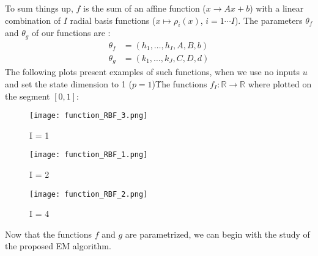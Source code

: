 To sum things up, $f$ is the sum of an affine function ($x \rightarrow Ax + b$) with a linear combination of $I$ radial basis functions ($x \mapsto \rho_i(x)$, $i=1 \cdots I$).
The parameters $\theta_f$ and $\theta_g$ of our functions are :
\begin{eqnarray*}
  \theta_f &= \left( h_1, \ldots , h_I, A, B, b\right) \\
  \theta_g &= \left( k_1, \ldots , k_J, C, D, d\right)
\end{eqnarray*}
The following plots present examples of such functions, when we use no inputs $u$ and set the state dimension to 1 ($p = 1$)\. The functions $f_I : \mathbb{R} \to \mathbb{R}$ where plotted on the segment $\left [ 0 , 1 \right ]$:

\begin{figure}[H]
\captionsetup{labelformat=empty}
  \texttt{[image: function\_RBF\_3.png]}
  \caption{I = 1}
\endminipage\hfill
{}
  \texttt{[image: function\_RBF\_1.png]}
  \caption{I = 2}
\endminipage\hfill
{}
  \texttt{[image: function\_RBF\_2.png]}
  \caption{I = 4}
\endminipage\hfill
\end{figure}

Now that the functions $f$ and $g$ are parametrized, we can begin with the study of the proposed EM algorithm.
